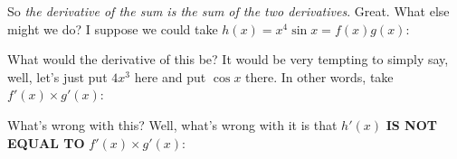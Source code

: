 \documentclass[pdftex, brazil, 12pt, twoside]{article}
\begin{document}
So \emph{the derivative of the sum is the sum of the two derivatives}.
Great.
What else might we do?
I suppose we could take $h(x) = x^4\sin{x} = f(x)g(x)$:

\begin{figure}[H]
  \begin{center}
  \end{center}
\end{figure}

What would the derivative of this be?
It would be very tempting to simply say, well, let's just
put $4x^3$ here and put $\cos{x}$ there.
In other words, take $f'(x) \times g'(x)$:

\begin{figure}[H]
  \begin{center}
  \end{center}
\end{figure}

What's wrong with this?
Well, what's wrong with it is that $h'(x)$ \textbf{IS NOT EQUAL TO}
$f'(x) \times g'(x)$:

\begin{figure}[H]
  \begin{center}
  \end{center}
\end{figure}
\end{document}
